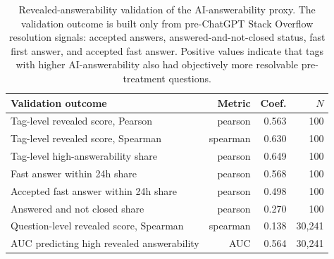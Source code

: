 \begin{table}[ht]
\centering
\caption{Revealed-answerability validation of the AI-answerability proxy. The validation outcome is built only from pre-ChatGPT Stack Overflow resolution signals: accepted answers, answered-and-not-closed status, fast first answer, and accepted fast answer. Positive values indicate that tags with higher AI-answerability also had objectively more resolvable pre-treatment questions.}
\label{tab:revealed_answerability_validation}
\small
\begin{tabular}{lrrr}
\toprule
Validation outcome & Metric & Coef. & $N$ \\
\midrule
Tag-level revealed score, Pearson & pearson & 0.563 & 100 \\
Tag-level revealed score, Spearman & spearman & 0.630 & 100 \\
Tag-level high-answerability share & pearson & 0.649 & 100 \\
Fast answer within 24h share & pearson & 0.568 & 100 \\
Accepted fast answer within 24h share & pearson & 0.498 & 100 \\
Answered and not closed share & pearson & 0.270 & 100 \\
Question-level revealed score, Spearman & spearman & 0.138 & 30,241 \\
AUC predicting high revealed answerability & AUC & 0.564 & 30,241 \\
\bottomrule
\end{tabular}
\end{table}